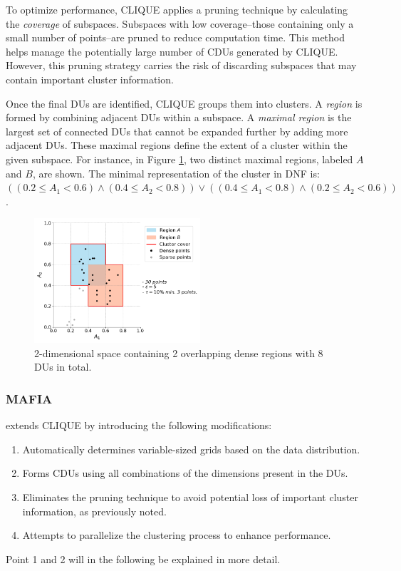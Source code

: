 To optimize performance, CLIQUE applies a pruning technique by calculating the \textit{coverage} of subspaces. Subspaces with low coverage--those containing only a small number of points--are pruned to reduce computation time. This method helps manage the potentially large number of CDUs generated by CLIQUE. However, this pruning strategy carries the risk of discarding subspaces that may contain important cluster information.

Once the final DUs are identified, CLIQUE groups them into clusters. A \textit{region} is formed by combining adjacent DUs within a subspace. A \textit{maximal region} is the largest set of connected DUs that cannot be expanded further by adding more adjacent DUs. These maximal regions define the extent of a cluster within the given subspace. For instance, in Figure \ref{fig:dense_cells_and_regions}, two distinct maximal regions, labeled $A$ and $B$, are shown. The minimal representation of the cluster in DNF is: $((0.2 \leq A_1 < 0.6) \land (0.4 \leq A_2 < 0.8)) \lor ((0.4 \leq A_1 < 0.8) \land (0.2 \leq A_2 < 0.6))$.
\begin{figure}[H]
    \centering
    \includegraphics[width=0.55\textwidth]{figures/dense_cells_and_regions.png}
    \caption{2-dimensional space containing 2 overlapping dense regions with 8 DUs in total.}
    \label{fig:dense_cells_and_regions}
    \vspace*{-0.7cm}
\end{figure}

\subsubsection{MAFIA}
extends CLIQUE by introducing the following modifications:
\begin{enumerate}
    \item Automatically determines variable-sized grids based on the data distribution.
    \item Forms CDUs using all combinations of the dimensions present in the DUs.
    \item Eliminates the pruning technique to avoid potential loss of important cluster information, as previously noted.
    \item Attempts to parallelize the clustering process to enhance performance.
\end{enumerate}
Point 1 and 2 will in the following be explained in more detail.

